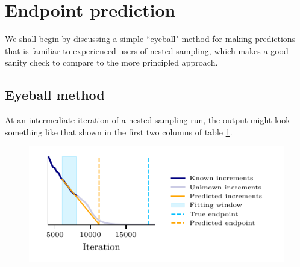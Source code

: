 \documentclass[usenatbib]{mnras}
\begin{document}
\section{Endpoint prediction}\label{sec:Endpoint prediction}
We shall begin by discussing a simple ``eyeball" method for making predictions that is familiar to experienced users of nested sampling, which makes a good sanity check to compare to the more principled approach.
\subsection{Eyeball method}
At an intermediate iteration of a nested sampling run, the output might look something like that shown in the first two columns of table \ref{tab:ns_output}. 
\begin{figure}
\centering
{}
\label{tab:ns_output}
\end{figure}
\begin{figure}
  \centering
  \includegraphics{Figures/linear_extrapolate.pdf}
  \label{fig:linear_extrapolate}
\end{figure}
\end{document}
